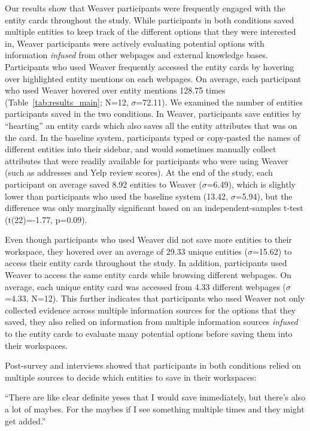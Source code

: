Our results show that Weaver participants were frequently engaged with the entity cards throughout the study. While participants in both conditions saved multiple entities to keep track of the different options that they were interested in, Weaver participants were actively evaluating potential options with information \emph{infused} from other webpages and external knowledge bases. Participants who used Weaver frequently accessed the entity cards by hovering over highlighted entity mentions on each webpages. On average, each participant who used Weaver hovered over entity mentions 128.75 times (Table~\ref{tab:results_main}; N=12, $\sigma$=72.11). We examined the number of entities participants saved in the two conditions. In Weaver, participants save entities by ``hearting'' an entity cards which also saves all the entity attributes that was on the card. In the baseline system, participants typed or copy-pasted the names of different entities into their sidebar, and would sometimes manually collect attributes that were readily available for participants who were using Weaver (such as addresses and Yelp review scores). At the end of the study, each participant on average saved 8.92 entities to Weaver ($\sigma$=6.49), which is slightly lower than participants who used the baseline system (13.42, $\sigma$=5.94), but the difference was only marginally significant based on an independent-samples t-test (t(22)=-1.77, p=0.09).

Even though participants who used Weaver did not save more entities to their workspace, they hovered over an average of 29.33 unique entities ($\sigma$=15.62) to access their entity cards throughout the study. In addition,
participants used Weaver to access the same entity cards while browsing different webpages. On average, each unique entity card was accessed from 4.33 different webpages ($\sigma$=4.33, N=12). This further indicates that participants who used Weaver not only collected evidence across multiple information sources for the options that they saved, they also relied on information from multiple information sources \emph{infused} to the entity cards to evaluate many potential options before saving them into their workspaces.

Post-survey and interviews showed that participants in both conditions relied on multiple sources to decide which entities to save in their workspaces: 

\begin{tightquote}
``There are like clear definite yeses that I would save immediately, but there's also a lot of maybes. For the maybes if I see something multiple times and they might get added.''
\end{tightquote}

